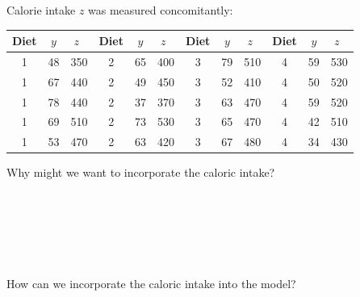 Calorie intake $z$ was measured concomitantly:
\begin{center}
\begin{tabular}{ccc|ccc|ccc|ccc}
Diet & $y$ & $z\ \ $ & Diet & $y$ & $z\ \ $ &Diet & $y$ & $z\ \ $ &Diet & $y$ & $z\ \ $ \\ \hline
1 & 48 & 350 & 2 & 65 & 400 & 3 & 79 & 510 & 4 & 59 & 530 \\
1 & 67 & 440 & 2 & 49 & 450 & 3 & 52 & 410 & 4 & 50 & 520 \\
1 & 78 & 440 & 2 & 37 & 370 & 3 & 63 & 470 & 4 & 59 & 520 \\
1 & 69 & 510 & 2 & 73 & 530 & 3 & 65 & 470 & 4 & 42 & 510 \\
1 & 53 & 470 & 2 & 63 & 420 & 3 & 67 & 480 & 4 & 34 & 430 \\ \hline
\end{tabular} 
\end{center}

Why might we want to incorporate the caloric intake?\\~\\~\\~\\~\\~\\~\\

How can we incorporate the caloric intake into the model?\\~\\~\\~\\~\\


